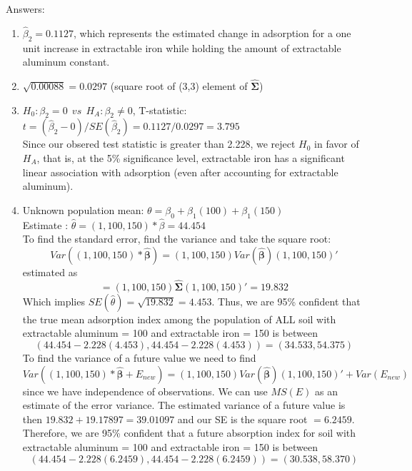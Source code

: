 \documentclass{article}
\begin{document}
Answers:
\begin{enumerate}
\item $\hat\beta_2 =0.1127$, which represents the estimated change in adsorption for a one unit increase in extractable iron while holding the amount of extractable aluminum constant.
\item $\sqrt{0.00088}=0.0297$ (square root of (3,3) element of $\widehat{\boldsymbol{\Sigma}}$)
\item $H_0: \beta_2=0 ~~ vs ~~ H_A: \beta_2\ne 0$, T-statistic: $t=(\hat\beta_2 - 0)/SE(\hat\beta_2) = 0.1127/0.0297 = 3.795$ \\
Since our obsered test statistic is greater than 2.228, we reject $H_0$ in favor of $H_A$, that is, at the 5\% significance level, extractable iron has a significant linear association with adsorption (even after accounting for extractable aluminum).
\item  Unknown population mean: $\theta=\beta_0+\beta_1(100) +\beta_1(150)$ \\
Estimate : $\hat\theta=(1,100,150)* \hat\beta = 44.454$\\
To find the standard error, find the variance and take the square root:
$$Var((1,100,150) * \hat{\boldsymbol{\beta}}) = (1,100,150)Var(\hat{\boldsymbol{\beta}}) (1,100,150)'$$
estimated as
$$= (1,100,150)\widehat{\boldsymbol{\Sigma}} (1,100,150)'=19.832$$
Which implies $SE(\hat\theta) = \sqrt{19.832}=4.453$.  Thus, we are 95\% confident that the true mean adsorption index among the population of ALL soil with extractable aluminum = 100 and extractable iron = 150 is between 
$$(44.454-2.228(4.453), 44.454-2.228(4.453)) = (34.533, 54.375)$$
To find the variance of a future value we need to find
$$Var((1,100,150) * \hat{\boldsymbol{\beta}}+E_{new})=(1,100,150)Var(\hat{\boldsymbol{\beta}}) (1,100,150)'+Var(E_{new})$$
since we have independence of observations.  We can use $MS(E)$ as an estimate of the error variance.  The estimated variance of a future value is then $19.832+19.17897=39.01097$ and our SE is the square root $ = 6.2459$.  Therefore, we are 95\% confident that a future absorption index for soil with extractable aluminum = 100 and extractable iron = 150 is between 
$$(44.454-2.228(6.2459), 44.454-2.228(6.2459)) = (30.538, 58.370)$$
\end{enumerate}
\end{document}
